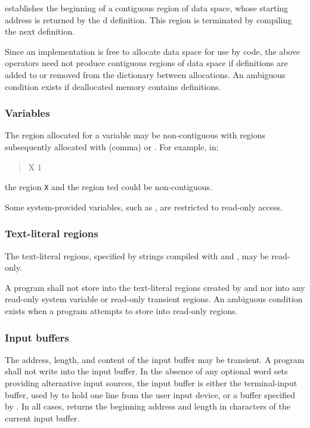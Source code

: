  establishes the beginning of a contiguous region of
data space, whose starting address is returned by the d
definition. This region is terminated by compiling the next
definition.

Since an implementation is free to allocate data space for use by
code, the above operators need not produce contiguous regions of
data space if definitions are added to or removed from the
dictionary between allocations. An ambiguous condition exists if
deallocated memory contains definitions.


\subsubsection{Variables} %
\label{usage:var}

The region allocated for a variable may be non-contiguous with
regions subsequently allocated with \word{,} (comma) or
. For example, in:
\begin{quote}
	 X 1  
\end{quote}
the region \texttt{X} and the region ted could be
non-contiguous.

Some system-provided variables, such as , are
restricted to read-only access.


\subsubsection{Text-literal regions} %
\label{usage:"literal}

The text-literal regions, specified by strings compiled with
 and , may be read-only.

A program shall not store into the text-literal regions created
by  and  nor into any read-only system variable
or read-only transient regions. An ambiguous condition exists when
a program attempts to store into read-only regions.

\subsubsection{Input buffers} %
\label{usage:inbuf}

The address, length, and content of the input buffer may be
transient. A program shall not write into the input buffer. In the
absence of any optional word sets providing alternative input
sources, the input buffer is either the terminal-input buffer, used
by  to hold one line from the user input device, or a
buffer specified by . In all cases, 
returns the beginning address and length in characters of the
current input buffer.

